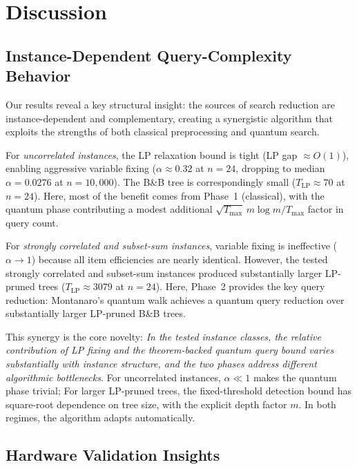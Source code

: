 \documentclass[conference]{IEEEtran} \IEEEoverridecommandlockouts
\begin{document}
\section{Discussion}

\subsection{Instance-Dependent Query-Complexity Behavior}

Our results reveal a key structural insight: the sources of search reduction are instance-dependent and complementary, creating a synergistic algorithm that exploits the strengths of both classical preprocessing and quantum search.

For \textit{uncorrelated instances}, the LP relaxation bound is tight (LP gap $\approx O(1)$), enabling aggressive variable fixing ($\alpha \approx 0.32$ at $n = 24$, dropping to median $\alpha = 0.0276$ at $n = 10{,}000$). The B\&B tree is correspondingly small ($T_{\text{LP}} \approx 70$ at $n=24$). Here, most of the benefit comes from Phase~1 (classical), with the quantum phase contributing a modest additional $\sqrt{T_{\max}}\,m\log m / T_{\max}$ factor in query count.

For \textit{strongly correlated and subset-sum instances}, variable fixing is ineffective ($\alpha \to 1$) because all item efficiencies are nearly identical. However, the tested strongly correlated and subset-sum instances produced substantially larger LP-pruned trees ($T_{\text{LP}} \approx 3079$ at $n=24$). Here, Phase~2 provides the key query reduction: Montanaro's quantum walk achieves a quantum query reduction over substantially larger LP-pruned B\&B trees.

This synergy is the core novelty: \textit{In the tested instance classes, the relative contribution of LP fixing and the theorem-backed quantum query bound varies substantially with instance structure, and the two phases address different algorithmic bottlenecks}. For uncorrelated instances, $\alpha \ll 1$ makes the quantum phase trivial; For larger LP-pruned trees, the fixed-threshold detection bound has square-root dependence on tree size, with the explicit depth factor $m$. In both regimes, the algorithm adapts automatically.

\subsection{Hardware Validation Insights}
\end{document}
